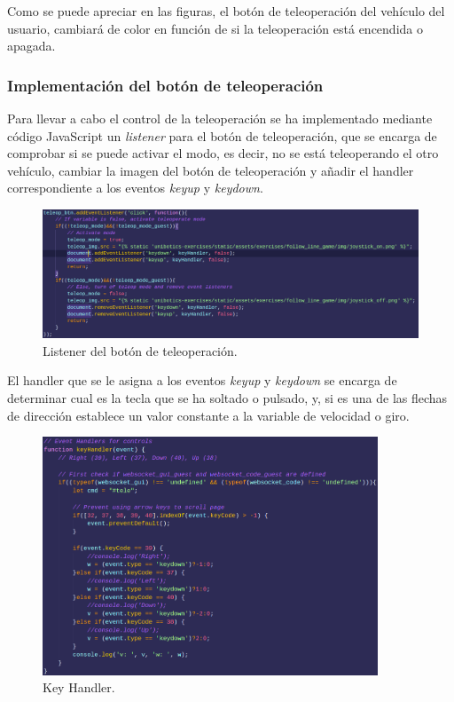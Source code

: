 \documentclass[a4paper, 12pt]{book}
\begin{document}
Como se puede apreciar en las figuras, el botón de teleoperación del vehículo del usuario, cambiará de color en función de si la teleoperación está encendida o apagada.

\subsubsection{Implementación del botón de teleoperación}
\label{follow_line_game_mode_teleoperado_impl}

Para llevar a cabo el control de la teleoperación se ha implementado mediante código JavaScript un \emph{listener} para el botón de teleoperación, que se encarga de comprobar si se puede activar el modo, es decir, no se está teleoperando el otro vehículo, cambiar la imagen del botón de teleoperación y añadir el handler correspondiente a los eventos \emph{keyup} y \emph{keydown}.

\begin{figure}[H]
	\centering
    \includegraphics[width=15cm]{img/teleop_mode_code.png}
    \caption{Listener del botón de teleoperación.}
    \label{figura:difficulty_selector}
\end{figure}

El handler que se le asigna a los eventos \emph{keyup} y \emph{keydown} se encarga de determinar cual es la tecla que se ha soltado o pulsado, y, si es una de las flechas de dirección establece un valor constante a la variable de velocidad o giro.

\begin{figure}[H]
	\centering
    \includegraphics[width=10cm]{img/keyhandler.png}
    \caption{Key Handler.}
    \label{figura:keyhandler}
\end{figure}
\end{document}
